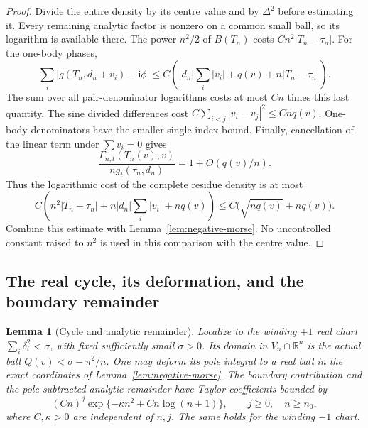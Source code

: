 \documentclass[11pt]{article}
\numberwithin{equation}{section}
\newtheorem{lemma}[theorem]{Lemma}
\theoremstyle{definition}
\newcommand{\R}{\mathbb R}
\newcommand{\ii}{\mathrm i}
\begin{document}
\begin{proof}
Divide the entire density by its centre value and by $\Delta^2$ before
estimating it.  Every remaining analytic factor is nonzero on a common
small ball, so its logarithm is available there.  The power $n^2/2$
of $B(T_n)$ costs $Cn^2|T_n-\tau_n|$.  For the one-body phases,
\[
 \sum_i|g(T_n,d_n+v_i)-\ii\phi|
 \le C\left(|d_n|\sum_i|v_i|+q(v)+n|T_n-\tau_n|\right).
\]
The sum over all pair-denominator logarithms costs at most $Cn$ times
this last quantity.  The sine divided differences cost
$C\sum_{i<j}|v_i-v_j|^2\le Cnq(v)$.  One-body denominators have the
smaller single-index bound.  Finally, cancellation of the linear term
under $\sum v_i=0$ gives
\[
 \frac{\Gamma_{n,t}(T_n(v),v)}{n g_t(\tau_n,d_n)}
 =1+O(q(v)/n).
\]
Thus the logarithmic cost of the complete residue density is at most
\[
 C\left(n^2|T_n-\tau_n|+n|d_n|\sum_i|v_i|+nq(v)\right)
 \le C\bigl(\sqrt{nq(v)}+nq(v)\bigr).
\]
Combine this estimate with Lemma~\ref{lem:negative-morse}.  No
uncontrolled constant raised to $n^2$ is used in this comparison with
the centre value.
\end{proof}

\subsection{The real cycle, its deformation, and the boundary remainder}

\begin{lemma}[Cycle and analytic remainder]
\label{lem:morse-cycle-remainder}
Localize to the winding $+1$ real chart
$\sum_i\delta_i^2<\sigma$, with fixed sufficiently small $\sigma>0$.
Its domain in $V_n\cap\R^n$ is the actual ball
$Q(v)<\sigma-\pi^2/n$.  One may deform its pole integral to a real
ball in the exact coordinates of Lemma~\ref{lem:negative-morse}.
The boundary contribution and the pole-subtracted analytic remainder
have Taylor coefficients bounded by
\begin{equation}
 (C n)^j\exp\{-\kappa n^2+C n\log(n+1)\},
 \qquad j\ge0,\quad n\ge n_0,
 \label{eq:morse-boundary-remainder}
\end{equation}
where $C,\kappa>0$ are independent of $n,j$.  The same holds for
the winding $-1$ chart.
\end{lemma}
\end{document}

